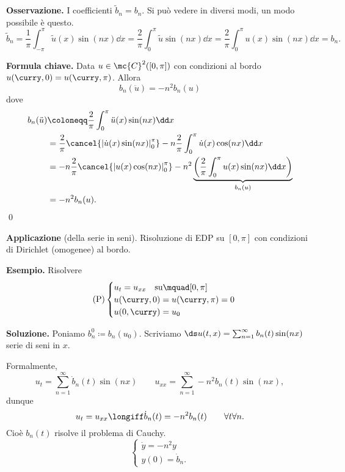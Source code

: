 \begin{itemize}
	\textbf{Osservazione.} I coefficienti $\tilde{b}_n = b_n$. Si può vedere in diversi modi, un modo possibile è questo.
	$$
		\tilde{b}_n = \frac{1}{\pi} \int_{-\pi}^{\pi} \tilde{u}(x) \sin(nx) \dd x 
		= \frac{2}{\pi} \int_{0}^{\pi} \tilde{u} \sin(nx) \dd x 
		= \frac{2}{\pi} \int_{0}^{\pi} u(x) \sin(nx) \dd x 
		= b_n.
	$$

	\textbf{Formula chiave.} Data $u \in \mc{C}^2 ([0,\pi])$ con condizioni al bordo $u(\curry, 0) = u(\curry, \pi)$. 
	Allora
	$$
		b_n(\ddot u) = -n^2 b_n(u)
	$$
	dove 
	\begin{align*}
		b_n(\ddot u) & \coloneqq \frac{2}{\pi} \int_0^\pi \ddot u(x) \sin(nx) \dd x \\
		& = \frac{2}{\pi} \cancel{\left| \dot u(x) \sin(nx) \right|_0^\pi} - n\frac{2}{\pi} \int_{0}^{\pi} \dot u(x) \cos(nx) \dd x \\
		& = -n \frac{2}{\pi} \cancel{\left| u(x) \cos(nx) \right|_0^\pi} - n^2  \underbrace{\left( \frac{2}{\pi} \int_{0}^{\pi} u(x) \sin(nx) \dd x \right)}_{b_n(u)} \\
		& = -n^2 b_n(u).
	\end{align*}
	\qed

\end{itemize}


\textbf{Applicazione} (della serie in seni). Risoluzione di EDP su $[0,\pi]$ con condizioni di Dirichlet (omogenee) al bordo.

\textbf{Esempio.} Risolvere
%
\begin{equation}
\label{eq:24nov-problema-1} \tag{P}
	\begin{cases}
		u_t = u_{xx} \quad \text{su} \mquad [0,\pi] \\
		u(\curry, 0) = u(\curry,\pi) = 0 \\
		u(0,\curry) = u_0
	\end{cases} 
\end{equation}

\textbf{Soluzione.} Poniamo $b_n^0 \coloneqq b_n (u_0)$.
Scriviamo $\ds u(t,x) = \sum_{n=1}^{\infty} b_n(t) \sin(nx) $ serie di seni in $x$.

Formalmente,
%
$$
	u_t = \sum_{n=1}^\infty \dot b_n(t) \sin(nx) \qquad 
	u_{xx} = \sum_{n=1}^{\infty} -n^2 b_n(t) \sin(nx),
$$
%
dunque
%
$$
	u_t = u_{xx} \longiff \dot b_n(t) = -n^2 b_n(t) \qquad \forall t \forall n.
$$
%
Cioè $b_n(t)$ risolve il problema di Cauchy.
\begin{equation}
	\label{eq:24nov-problema-2} \tag{P'}
	\begin{cases}
		\dot y = -n^2 y \\
		y(0) = \dot b_n.
	\end{cases}
\end{equation}

